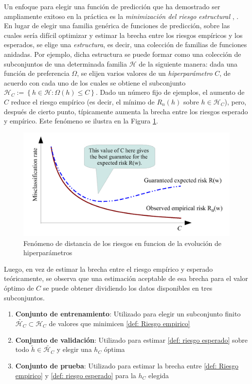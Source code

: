 Un enfoque para elegir una funci\'on de predicci\'on que ha demostrado ser ampliamente exitoso en la pr\'actica es la \textit{minimizaci\'on del riesgo estructural} \cite{vapnik:1974}, \cite{vapnik:1998}. En lugar de elegir una familia gen\'erica de funciones de predicci\'on, sobre las cuales ser\'ia dif\'icil optimizar y estimar la brecha entre los riesgos emp\'iricos y los esperados, se elige una \textit{estructura}, es decir, una colecci\'on de familias de funciones anidadas. Por ejemplo, dicha estructura se puede formar como una colecci\'on de subconjuntos de una determinada familia $\mathcal{H}$ de la siguiente manera: dada una funci\'on de preferencia $\Omega$, se elijen varios valores de un \textit{hiperpar\'ametro} $C$, de acuerdo con cada uno de los cuales se obtiene el subconjunto $\mathcal{H}_C := \left\lbrace h \in \mathcal{H} : \Omega (h) \leq C \right\rbrace$. Dado un n\'umero fijo de ejemplos, el aumento de $C$ reduce el riesgo emp\'irico (es decir, el m\'inimo de $R_n (h) $ sobre $h \in \mathcal{H}_C$), pero, despu\'es de cierto punto, t\'ipicamente aumenta la brecha entre los riesgos esperado y emp\'irico. Este fen\'omeno se ilustra en la Figura \ref{gfx: hiperparametros}.

\begin{figure}[h]
	\centering
	\includegraphics[scale=.3]{gfx/hyperparametros.png}
	\caption{Fen\'omeno de distancia de los riesgos en funcion de la evoluci\'on de hiperpar\'ametros}
	\label{gfx: hiperparametros}
\end{figure}

Luego, en vez de estimar la brecha entre el riesgo emp\'irico y esperado te\'oricamente, se observa que una estimaci\'on aceptable de esa brecha para el valor \'optimo de $C$ se puede obtener dividiendo los datos disponibles en tres subconjuntos.

\begin{enumerate}
	\item {\textbf{Conjunto de entrenamiento}}: Utilizado para elegir un subconjunto finito $\tilde{\mathcal{H}_C} \subset \mathcal{H}_C$ de valores que minimicen \ref{def: Riesgo empirico}
	\item{\textbf{Conjunto de validaci\'on}}: Utilizado para estimar \ref{def: riesgo esperado} sobre todo $\tilde{h} \in \tilde{\mathcal{H}_C}$ y elegir una $h_C$ \'optima
	\item{\textbf{Conjunto de prueba}}: Utilizado para estimar la brecha entre \ref{def: Riesgo empirico} y \ref{def: riesgo esperado} para la $h_C$ elegida
\end{enumerate}

